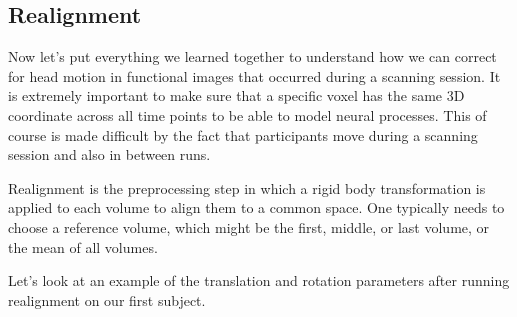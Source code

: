 \documentclass[letterpaper,10pt,english]{sphinxmanual}
\begin{document}
\subsection{Realignment}
\label{\detokenize{content/Preprocessing:realignment}}
Now let’s put everything we learned together to understand how we can correct for head motion in functional images that occurred during a scanning session. It is extremely important to make sure that a specific voxel has the same 3D coordinate across all time points to be able to model neural processes. This of course is made difficult by the fact that participants move during a scanning session and also in between runs.

Realignment is the preprocessing step in which a rigid body transformation is applied to each volume to align them to a common space. One typically needs to choose a reference volume, which might be the first, middle, or last volume, or the mean of all volumes.

Let’s look at an example of the translation and rotation parameters after running realignment on our first subject.
\end{document}
